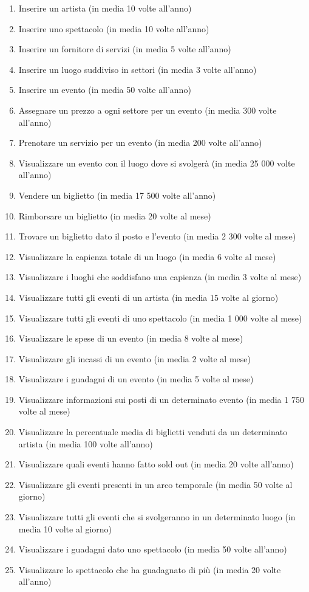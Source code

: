 \documentclass[a4paper,11pt]{article}
\begin{document}
\begin{enumerate}
    \item Inserire un artista (in media 10 volte all'anno)
    \item Inserire uno spettacolo (in media 10 volte all'anno)
    \item Inserire un fornitore di servizi (in media 5 volte all'anno)
    \item Inserire un luogo suddiviso in settori (in media 3 volte all'anno)
    \item \label{oploc1} Inserire un evento (in media 50 volte all'anno)
    \item \label{opsec1} Assegnare un prezzo a ogni settore per un evento (in media 300 volte all'anno)
    \item Prenotare un servizio per un evento (in media 200 volte all'anno)
    \item \label{oploc2} Visualizzare un evento con il luogo dove si svolgerà (in media 25 000 volte all'anno)
    \item Vendere un biglietto (in media 17 500 volte all'anno)
    \item Rimborsare un biglietto (in media 20 volte al mese)
    \item Trovare un biglietto dato il posto e l'evento (in media 2 300 volte al mese)
    \item Visualizzare la capienza totale di un luogo (in media 6 volte al mese)
    \item \label{search-venue-capacity-limit} Visualizzare i luoghi che soddisfano una capienza (in media 3 volte al mese)
    \item \label{oploc3} Visualizzare tutti gli eventi di un artista (in media 15 volte al giorno)
    \item Visualizzare tutti gli eventi di uno spettacolo (in media 1 000 volte al mese)
    \item \label{oploc4} Visualizzare le spese di un evento (in media 8 volte al mese)
    \item Visualizzare gli incassi di un evento (in media 2 volte al mese)
    \item \label{oploc5} Visualizzare i guadagni di un evento (in media 5 volte al mese)
    \item Visualizzare informazioni sui posti di un determinato evento (in media 1 750 volte al mese)
    \item Visualizzare la percentuale media di biglietti venduti da un determinato artista (in media 100 volte all'anno)
    \item Visualizzare quali eventi hanno fatto sold out (in media 20 volte all'anno)
    \item Visualizzare gli eventi presenti in un arco temporale (in media 50 volte al giorno)
    \item Visualizzare tutti gli eventi che si svolgeranno in un determinato luogo (in media 10 volte al giorno)
    \item Visualizzare i guadagni dato uno spettacolo (in media 50 volte all'anno)
    \item Visualizzare lo spettacolo che ha guadagnato di più (in media 20 volte all'anno)
\end{enumerate}
\end{document}
